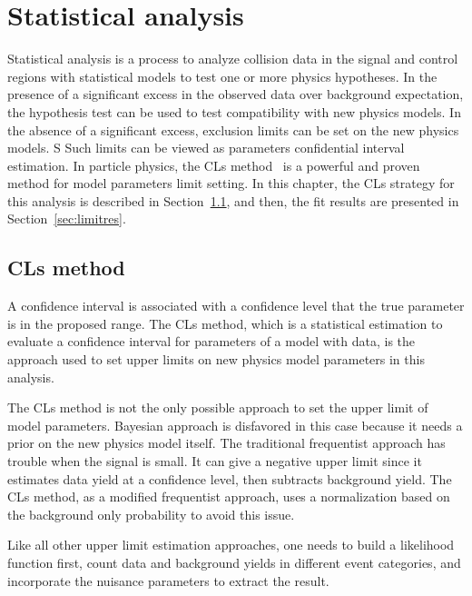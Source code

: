 \chapter{Statistical analysis}
\label{ch:stat-ana}

\par Statistical analysis is a process to analyze collision data in the signal and control regions with statistical models to test one or more physics hypotheses. 
In the presence of a significant excess in the observed data over background expectation, the hypothesis test can be used to test compatibility with new physics models. 
In the absence of a significant excess, exclusion limits can be set on the new physics models. S
Such limits can be viewed as parameters confidential interval estimation. 
In particle physics, the CLs method~\cite{Read:2002hq} is a powerful and proven method for model parameters limit setting. 
In this chapter, the CLs strategy for this analysis is described in Section~\ref{sec:cls}, and then, the fit results are presented in Section~\ref{sec:limitres}. 

\section{CLs method}
\label{sec:cls}

\par A confidence interval is associated with a confidence level that the true parameter is in the proposed range. 
The CLs method, which is a statistical estimation to evaluate a confidence interval for parameters of a model with data, is the approach used to set upper limits on new physics model parameters in this analysis.

\par The CLs method is not the only possible approach to set the upper limit of model parameters. 
Bayesian approach is disfavored in this case because it needs a prior on the new physics model itself.
The traditional frequentist approach has trouble when the signal is small. 
It can give a negative upper limit since it estimates data yield at a confidence level, then subtracts background yield.
The CLs method, as a modified frequentist approach, uses a normalization based on the background only probability to avoid this issue.

\par Like all other upper limit estimation approaches, one needs to build a likelihood function first, count data and background yields in different event categories, and incorporate the nuisance parameters to extract the result. 

